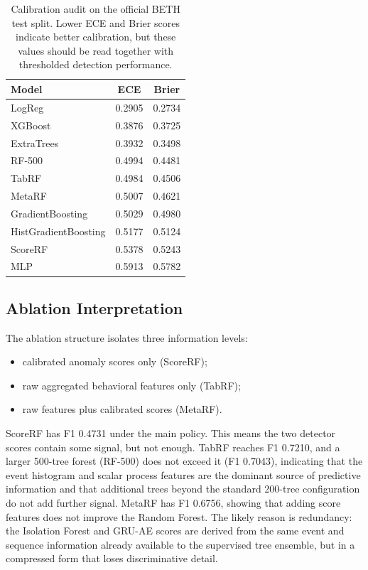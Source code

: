 \documentclass[10pt,journal,compsoc]{IEEEtran}
\begin{document}
\begin{table}[t]
\centering
\caption{Calibration audit on the official BETH test split. Lower ECE and Brier scores indicate better calibration, but these values should be read together with thresholded detection performance.}
\label{tab:calibration_audit}
\begin{tabular}{lcc}
\toprule
\textbf{Model} & \textbf{ECE} & \textbf{Brier} \\
\midrule
LogReg & 0.2905 & 0.2734 \\
XGBoost & 0.3876 & 0.3725 \\
ExtraTrees & 0.3932 & 0.3498 \\
RF-500 & 0.4994 & 0.4481 \\
TabRF & 0.4984 & 0.4506 \\
MetaRF & 0.5007 & 0.4621 \\
GradientBoosting & 0.5029 & 0.4980 \\
HistGradientBoosting & 0.5177 & 0.5124 \\
ScoreRF & 0.5378 & 0.5243 \\
MLP & 0.5913 & 0.5782 \\
\bottomrule
\end{tabular}
\end{table}

\subsection{Ablation Interpretation}

The ablation structure isolates three information levels:
\begin{itemize}
    \item calibrated anomaly scores only (ScoreRF);
    \item raw aggregated behavioral features only (TabRF);
    \item raw features plus calibrated scores (MetaRF).
\end{itemize}
ScoreRF has F1 0.4731 under the main policy. This means the two detector scores contain some signal, but not enough. TabRF reaches F1 0.7210, and a larger 500-tree forest (RF-500) does not exceed it (F1 0.7043), indicating that the event histogram and scalar process features are the dominant source of predictive information and that additional trees beyond the standard 200-tree configuration do not add further signal. MetaRF has F1 0.6756, showing that adding score features does not improve the Random Forest. The likely reason is redundancy: the Isolation Forest and GRU-AE scores are derived from the same event and sequence information already available to the supervised tree ensemble, but in a compressed form that loses discriminative detail.
\end{document}
